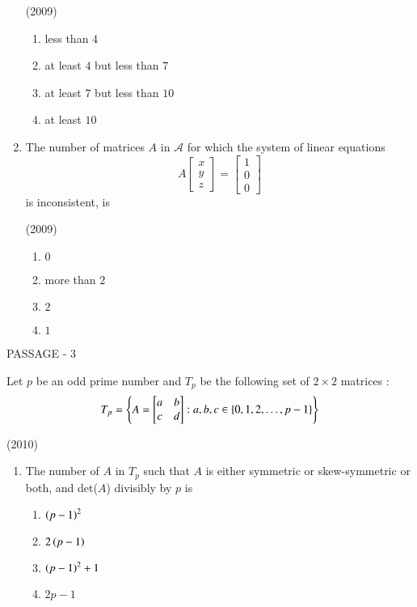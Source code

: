 \documentclass[journal,12pt,twocolumn]{IEEEtran}
\theoremstyle{remark}
\begin{document}
\begin{multicols}{2}
\begin{enumerate}
			\hfill(2009)

			\begin{enumerate}
				\item less than $4$
				\item at least $4$ but less than $7$
				\item at least $7$ but less than $10$
				\item at least $10$
			\end{enumerate}

		\item The number of matrices $A$ in $\mathcal{A}$ for which the system of linear equations
			$$A\begin{bmatrix}x \\ y \\ z\end{bmatrix}=\begin{bmatrix}1 \\ 0 \\ 0\end{bmatrix}$$
			is inconsistent, is

			\hfill(2009)

			\begin{enumerate}
				\item $0$
				\item more than $2$
				\item $2$
				\item $1$
			\end{enumerate}
	\end{enumerate}

	\bigskip
	\columnbreak

	{\centering PASSAGE - 3 \par}

	\bigskip

	Let $p$ be an odd prime number and $T_p$ be the following set of $2\times2$ matrices :
			$$T_p=\left\{A=\begin{bmatrix}a & b \\ c & d\end{bmatrix}:a,b,c\in\left\{0,1,2,\dots,p-1\right\}\right\}$$

			\hfill(2010)
	
	\begin{enumerate}
		\item The number of $A$ in $T_p$ such that $A$ is either symmetric or skew-symmetric or both, and det($A$) divisibly by $p$ is
			\begin{enumerate}
				\item $\left(p-1\right)^2$
				\item $2\left(p-1\right)$
				\item $\left(p-1\right)^2+1$
				\item $2p-1$
			\end{enumerate}



\end{enumerate}
\end{multicols}
\end{document}
